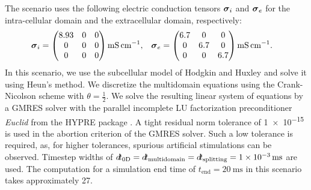 The scenario uses the following electric conduction tensors $\boldsymbol{\sigma}_i$ and $\boldsymbol{\sigma}_e$ for the intra-cellular domain and the extracellular domain, respectively:
\begin{align}\label{eq:multidomain_isotropic_e}
  \bfsigma_i &= \mat{
  8.93 & 0 & 0\\
  0& 0& 0\\
  0& 0& 0}\SI{}{\milli\siemens\per\centi\meter}, &  \bfsigma_e &= \mat{6.7 & 0 & 0\\
        0& 6.7& 0\\
        0& 0& 6.7}\SI{}{\milli\siemens\per\centi\meter}.
\end{align}
%
In this scenario, we use the subcellular model of Hodgkin and Huxley \cite{Hodgkin1952} and solve it using Heun's method. We discretize the multidomain equations using the Crank-Nicolson scheme with $\theta=\frac12$.
We solve the resulting linear system of equations by a GMRES solver with the parallel incomplete LU factorization preconditioner \emph{Euclid} \cite{euclid} from the HYPRE package \cite{falgout2002hypre}. A tight residual norm tolerance of \num{1e-15} is used in the abortion criterion of the GMRES solver. Such a low tolerance is required, as, for higher tolerances, spurious artificial stimulations can be observed. Timestep widths of $\dt_\text{0D}=\dt_\text{multidomain}=\dt_\text{splitting}=\SI{1e-3}{\ms}$ are used. 
The computation for a simulation end time of $t_\text{end}=\SI{20}{\ms}$ in this scenario takes approximately \SI{27}{\min}.


       
